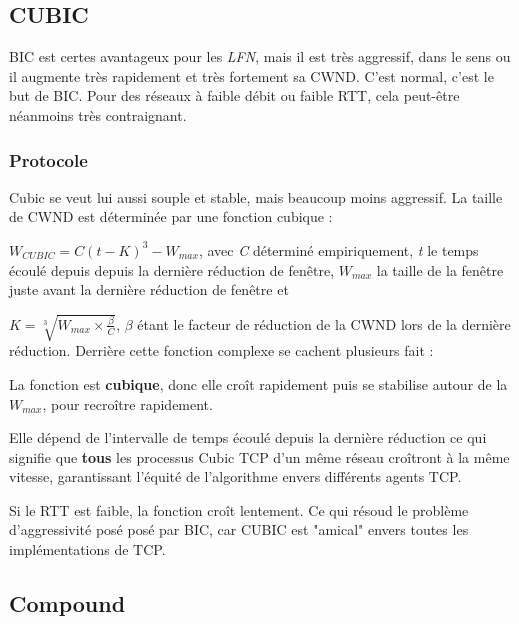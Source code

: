 \documentclass[	DIV=calc,%
							paper=a4,%
							fontsize=11pt,%
							twocolumn]{scrartcl}	 					%
\begin{document}
\subsection*{CUBIC}
BIC est certes avantageux pour les \textit{LFN}, mais il est très aggressif, dans le sens ou il augmente très rapidement et très fortement sa CWND. C'est normal, c'est le but de BIC. Pour des réseaux à faible débit ou faible RTT, cela peut-être néanmoins très contraignant.
\subsubsection*{Protocole}
Cubic se veut lui aussi souple et stable, mais beaucoup moins aggressif. La taille de CWND est déterminée par une fonction cubique : 

$W_{CUBIC} = C(t-K)^3 - W_{max}$, avec \textit{C} déterminé empiriquement, \textit{t} le temps écoulé depuis depuis la dernière réduction de fenêtre, $W_{max}$ la taille de la fenêtre juste avant la dernière réduction de fenêtre et 

$K = \sqrt[3]{W_{max}\times\frac{\beta}{C}}$, $\beta$ étant le facteur de réduction de la CWND lors de la dernière réduction.
Derrière cette fonction complexe se cachent plusieurs fait :
\begin{description}
\item{La fonction est \textbf{cubique}, donc elle croît rapidement puis se stabilise autour de la $W_{max}$, pour recroître rapidement.}
\item{Elle dépend de l'intervalle de temps écoulé depuis la dernière réduction ce qui signifie que \textbf{tous} les processus Cubic TCP d'un même réseau croîtront à la même vitesse, garantissant l'équité de l'algorithme envers différents agents TCP.}
\item{Si le RTT est faible, la fonction croît lentement. Ce qui résoud le problème d'aggressivité posé posé par BIC, car CUBIC est "amical" envers toutes les implémentations de TCP.}
\end{description}

\subsection*{Compound}
\end{document}
